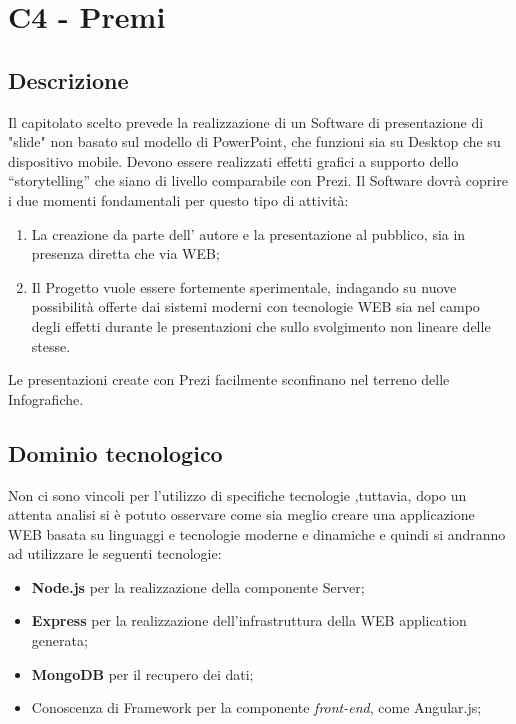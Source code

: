 \section{C4 - Premi}{
 \subsection{Descrizione}
   Il capitolato scelto prevede la realizzazione di un Software di presentazione di "slide" non basato sul modello di PowerPoint, che funzioni sia su Desktop che su dispositivo mobile. Devono essere realizzati effetti grafici a supporto dello  “storytelling” che siano di livello comparabile con Prezi.
   Il Software dovrà coprire i due momenti fondamentali per questo tipo di attività:
   \begin{enumerate}
   		\item La creazione da parte dell' autore e la presentazione al pubblico, sia in presenza diretta che via WEB;
   		\item Il Progetto vuole essere fortemente sperimentale, indagando su nuove possibilità  offerte dai sistemi moderni con tecnologie WEB sia nel campo degli effetti durante le presentazioni che sullo svolgimento non lineare delle stesse.
   \end{enumerate}
   Le presentazioni create con Prezi facilmente sconfinano nel terreno delle Infografiche.

\subsection{Dominio tecnologico}
Non ci sono vincoli per l'utilizzo di specifiche tecnologie ,tuttavia, dopo un attenta analisi si è potuto osservare come sia meglio creare una applicazione WEB basata su linguaggi e tecnologie moderne e dinamiche e quindi si andranno ad utilizzare le seguenti tecnologie:
\begin{itemize}
\item \textbf{Node.js}  per la realizzazione della componente Server;
\item \textbf{Express}  per la realizzazione dell'infrastruttura della WEB application generata;
\item \textbf{MongoDB}  per il recupero dei dati;
\item Conoscenza di Framework per la componente \emph{front-end}, come Angular.js;

\end{itemize}
}
